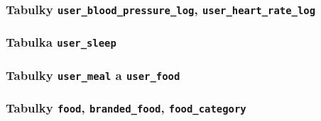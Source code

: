 \subsubsection{Tabulky \texttt{user\_blood\_pressure\_log}, \texttt{user\_heart\_rate\_log}}

\subsubsection{Tabulka \texttt{user\_sleep}}

\subsubsection{Tabulky \texttt{user\_meal} a \texttt{user\_food}}

\subsubsection{Tabulky \texttt{food}, \texttt{branded\_food}, \texttt{food\_category}}

